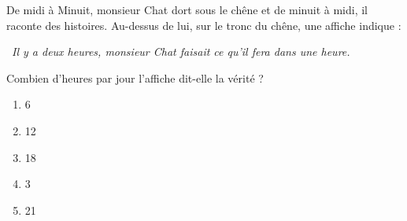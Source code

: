 De midi à Minuit, monsieur Chat dort sous le chêne et de minuit à midi, il raconte des histoires. Au-dessus de lui, sur le tronc du chêne, une affiche indique :
\par\og\ {\em Il y a deux heures, monsieur Chat faisait ce qu'il fera dans une heure.}\fg\par Combien d'heures par jour l'affiche dit-elle la vérité ?
\begin{multicols}{5}
  \begin{enumerate}[A/]
  \item 6
  \item 12
  \item 18
  \item 3
  \item 21
  \end{enumerate}
\end{multicols}
